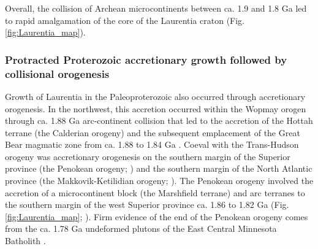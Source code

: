 \documentclass[twocolumn, switch]{article} %
\begin{document}
Overall, the collision of Archean microcontinents between ca. 1.9 and 1.8 Ga led to rapid amalgamation of the core of the Laurentia craton (Fig. \ref{fig:Laurentia_map}). 

\subsubsection{Protracted Proterozoic accretionary growth followed by collisional orogenesis}

Growth of Laurentia in the Paleoproterozoic also occurred through accretionary orogenesis. In the northwest, this accretion occurred within the Wopmay orogen through ca. 1.88 Ga arc-continent collision that led to the accretion of the Hottah terrane (the Calderian orogeny) and the subsequent emplacement of the Great Bear magmatic zone from ca. 1.88 to 1.84 Ga \citep{Hildebrand2009a}. Coeval with the Trans-Hudson orogeny was accretionary orogenesis on the southern margin of the Superior province (the Penokean orogeny; \citealp{Schulz2007a}) and the southern margin of the North Atlantic province (the Makkovik-Ketilidian orogeny; \citealp{Kerr1996a}). The Penokean orogeny involved the accretion of a microcontinent block (the Marshfield terrane) and arc terranes to the southern margin of the west Superior province ca. 1.86 to 1.82 Ga (Fig. \ref{fig:Laurentia_map}; \citealp{Schulz2007a}). Firm evidence of the end of the Penokean orogeny comes from the ca. 1.78 Ga undeformed plutons of the East Central Minnesota Batholith \citep{Holm2005a, Swanson-Hysell2021a}.
\end{document}
